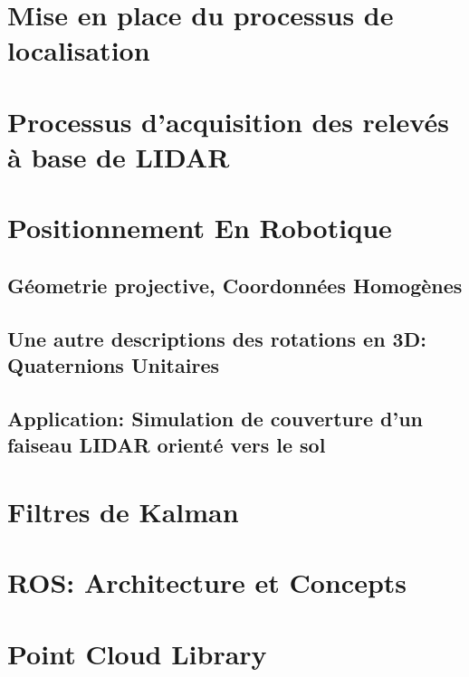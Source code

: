 \documentclass[12pt,a4paper]{report}
\begin{document}
		
		

\chapter{Mise en place du processus de localisation}

\chapter{Processus d'acquisition des relevés à base de LIDAR}



\begin{appendix}
	\chapter{Positionnement En Robotique}
		\section{Géometrie projective, Coordonnées Homogènes}
		\section{Une autre descriptions des rotations en 3D: Quaternions Unitaires}
		\section{Application: Simulation de couverture d'un faiseau LIDAR orienté vers le sol}
	
	\chapter{Filtres de Kalman}
	
	\chapter{ROS: Architecture et Concepts}
	
	\chapter{Point Cloud Library}

\end{appendix}



\end{document}
